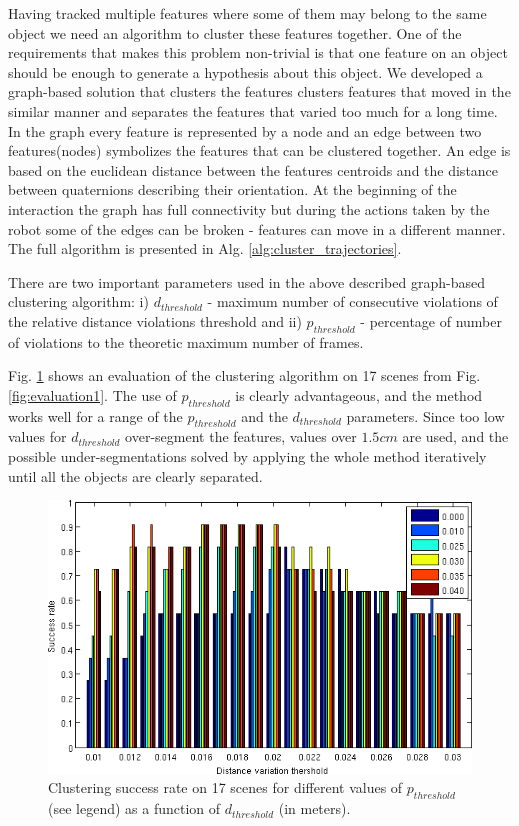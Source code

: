 Having tracked multiple features where some of them may belong to the same object we need an algorithm to cluster these features together. One of the requirements that makes this problem non-trivial is that one feature on an object should be enough to generate a hypothesis about this object. We developed a graph-based solution that clusters the features clusters features that moved in the similar manner and separates the features that varied too much for a long time. In the graph every feature is represented by a node and an edge between two features(nodes) symbolizes the features that can be clustered together. An edge is based on the euclidean distance between the features centroids and the distance between quaternions describing their orientation. At the beginning of the interaction the graph has full connectivity but during the actions taken by the robot some of the edges can be broken - features can move in a different manner.
The full algorithm is presented in Alg. \ref{alg:cluster_trajectories}.

There are two important parameters used in the above described graph-based clustering algorithm: i) $d_{threshold}$ - maximum number of consecutive violations of the relative distance violations threshold and ii) $p_{threshold}$ - percentage of number of violations to the theoretic maximum number of frames.


 Fig. \ref{fig:clustering} 
shows an evaluation of the clustering algorithm on 17 scenes from Fig. \ref{fig:evaluation1}.
 The use of $p_{threshold}$ is clearly advantageous, and the method works well for a range of the $p_{threshold}$ and the $d_{threshold}$ parameters. 
 Since too low values for $d_{threshold}$ over-segment the features, values over $1.5cm$ are used, and the possible under-segmentations solved
 by applying the whole method iteratively until all the objects are clearly separated.
 

\begin{figure}[tb!]
   \begin{center}
     \includegraphics[width=.9\columnwidth]{figures/distribution.png}
		\vspace{-2ex}
   \caption{Clustering success rate on 17 scenes for different values of $p_{threshold}$ (see legend) as a function of $d_{threshold}$ (in meters).}
   \label{fig:clustering}
 \end{center}
 \end{figure}


